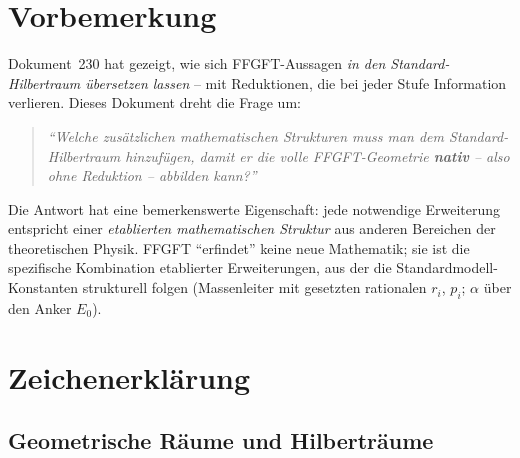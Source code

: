 
\section*{Vorbemerkung}

Dokument~230 hat gezeigt, wie sich FFGFT-Aussagen \emph{in den
Standard-Hilbertraum übersetzen lassen} -- mit Reduktionen, die bei
jeder Stufe Information verlieren. Dieses Dokument dreht die
Frage um:

\begin{quote}
\itshape
\enquote{Welche zusätzlichen mathematischen Strukturen muss man dem
Standard-Hilbertraum hinzufügen, damit er die volle FFGFT-Geometrie
\textbf{nativ} -- also ohne Reduktion -- abbilden kann?}
\end{quote}

Die Antwort hat eine bemerkenswerte Eigenschaft: jede notwendige
Erweiterung entspricht einer \emph{etablierten mathematischen
Struktur} aus anderen Bereichen der theoretischen Physik. FFGFT
\enquote{erfindet} keine neue Mathematik; sie ist die spezifische
Kombination etablierter Erweiterungen, aus der die
Standardmodell-Konstanten strukturell folgen (Massenleiter mit
gesetzten rationalen $r_i$, $p_i$; $\alpha$ über den Anker $E_0$).

\section*{Zeichenerklärung}

\subsection*{Geometrische Räume und Hilberträume}

